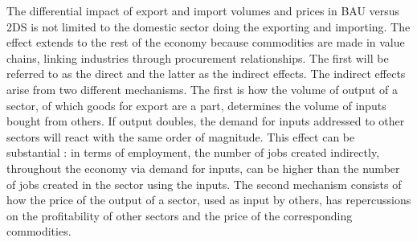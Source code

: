 \documentclass[12pt,english]{article}
\begin{document}
The differential impact of export and import volumes and prices in BAU versus 2DS is not limited to %
the domestic sector doing the exporting and importing. The effect extends to the rest of the economy because commodities are made in value chains, linking industries through procurement %
relationships. The first will be referred to as the direct and the latter as the indirect effects. The indirect effects arise from two different mechanisms. The first is how the volume of output of a sector, of which goods for export are a part, determines the volume of inputs bought from others. %
If output doubles,  %
the demand for inputs addressed to other sectors will react with the same order of magnitude. This effect can be substantial : in terms of employment, the number of jobs created indirectly, throughout the economy via demand for inputs, can be higher than the number of jobs created in the sector using the inputs. The second mechanism consists of how the price of the output of a sector, used as input by others, has repercussions on the profitability of other sectors and the price of the corresponding commodities. 

 
\end{document}
